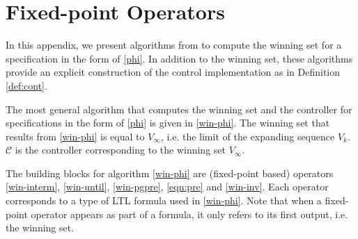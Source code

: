 \section{Fixed-point Operators}\label{app:basic-alg}

In this appendix, we present algorithms from \cite{Nilsson2017} to compute the winning set for a specification in the form of \eqref{phi}. In addition to the winning set, these algorithms provide an explicit construction of the control implementation as in Definition \ref{def:cont}. 

The most general algorithm that computes the winning set and the controller for specifications in the form of \eqref{phi} is given in \eqref{win-phi}. The winning set that results from \eqref{win-phi} is equal to $ V_{\infty} $, i.e. the limit of the expanding sequence $V_k$. $ \mathcal{C} $ is the controller corresponding to the winning set $ V_{\infty} $. 

The building blocks for algorithm \eqref{win-phi} are (fixed-point based) operators \eqref{win-interm}, \eqref{win-until}, \eqref{win-pgpre}, \eqref{eqn:pre} and \eqref{win-inv}. Each operator corresponds to a type of LTL formula used in \eqref{win-phi}. Note that when a fixed-point operator appears as part of a formula, it only refers to its first output, i.e. the winning set.




